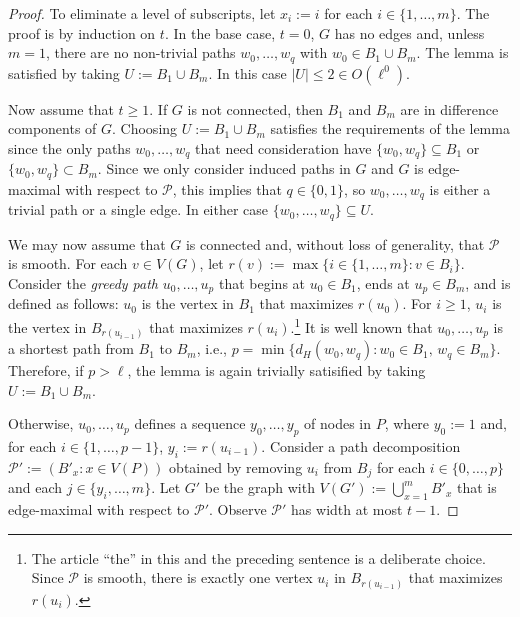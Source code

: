 \documentclass[kpfonts]{patmorin}
\theoremstyle{named}
\begin{document}
\begin{proof}
    To eliminate a level of subscripts, let $x_i:=i$ for each $i\in\{1,\ldots,m\}$.  The proof is by induction on $t$. In the base case, $t=0$, $G$ has no edges and, unless $m=1$, there are no non-trivial paths $w_0,\ldots,w_q$ with $w_0\in B_{1}\cup B_m$. The lemma is satisfied by taking $U:=B_{1}\cup B_{m}$.  In this case $|U|\le 2\in O(\ell^0)$.

    Now assume that $t\ge 1$. If $G$ is not connected, then $B_{1}$ and $B_{m}$ are in difference components of $G$.  Choosing $U:=B_{1}\cup B_{m}$ satisfies the requirements of the lemma since the only paths $w_0,\ldots,w_q$ that need consideration have $\{w_0,w_q\}\subseteq B_1$ or $\{w_0,w_q\}\subset B_m$.  Since we only consider induced paths in $G$ and $G$ is edge-maximal with respect to $\mathcal{P}$, this implies that $q\in\{0,1\}$, so $w_0,\ldots,w_q$ is either a trivial path or a single edge. In either case $\{w_0,\ldots,w_q\}\subseteq U$.

    We may now assume that $G$ is connected and, without loss of generality, that $\mathcal{P}$ is smooth. For each $v\in V(G)$, let $r(v):=\max\{i\in\{1,\ldots,m\}:v\in B_i\}$.  Consider the \emph{greedy path} $u_0,\ldots,u_p$ that begins at $u_0\in B_{1}$, ends at $u_p\in B_{m}$, and is defined as follows: $u_0$ is the vertex in $B_{1}$ that maximizes $r(u_0)$.  For $i\ge 1$, $u_i$ is the vertex in $B_{r(u_{i-1})}$ that maximizes $r(u_i)$.\footnote{The article ``the'' in this and the preceding sentence is a deliberate choice. Since $\mathcal{P}$ is smooth, there is exactly one vertex $u_i$ in $B_{r(u_{i-1})}$ that maximizes $r(u_i)$.}  It is well known that $u_0,\ldots,u_p$ is a shortest path from $B_{1}$ to $B_{m}$, i.e., $p=\min\{d_H(w_0,w_q): w_0\in B_1,\, w_q\in B_m\}$.  Therefore, if $p>\ell$, the lemma is again trivially satisified by taking $U:=B_{1}\cup B_{m}$.

    Otherwise, $u_0,\ldots,u_p$ defines a sequence $y_0,\ldots,y_p$ of nodes in $P$, where $y_0:=1$ and, for each $i\in\{1,\ldots,p-1\}$, $y_{i}:=r(u_{i-1})$.  Consider a path decomposition $\mathcal{P'}:=(B'_x:x\in V(P))$  obtained by removing $u_i$ from $B_{j}$ for each $i\in\{0,\ldots,p\}$ and each $j\in\{y_i,\ldots,m\}$. Let $G'$ be the graph with $V(G'):=\bigcup_{x=1}^m B'_x$ that is edge-maximal with respect to $\mathcal{P}'$.  Observe $\mathcal{P'}$ has width at most $t-1$.


\end{proof}
\end{document}
